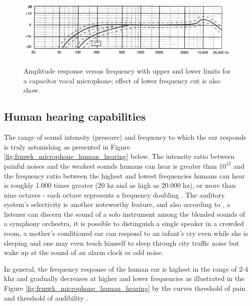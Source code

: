 \begin{figure}[htbp]
    \raggedright
        \caption{Amplitude response versus frequency with upper and lower limits for a capacitor vocal microphone; effect of lower frequency cut is also show.}
        \includegraphics[width=1\textwidth]{resources/images/030-theoretical_framework/Framework_microphone_frequency_response.png}
        \label{fig:frmwk_microphone_frequency_response}
\end{figure}

\subsection{Human hearing capabilities}
\label{subsec:microphones_Human_hearing_capabilities}

The range of sound intensity (pressure) and frequency to which the ear responds is truly astonishing as presented in Figure \ref{fig:frmwk_microphone_human_hearing} below. The intensity ratio between painful noises and the weakest sounds humans can hear is greater than $10^{12}$ and the frequency ratio between the highest and lowest frequencies humans can hear is roughly 1.000 times greater (20 \gls{hz} and as high as 20.000 \gls{hz}), or more than nine octaves - each octave represents a frequency doubling \cite{Rossing2013}. The auditory system's selectivity is another noteworthy feature, and also according to \textcite{Rossing2013}, a listener can discern the sound of a solo instrument among the blended sounds of a symphony orchestra, it is possible to distinguish a single speaker in a crowded room, a mother's conditioned ear can respond to an infant's cry even while she is sleeping and one may even teach himself to sleep through city traffic noise but wake up at the sound of an alarm clock or odd noise.

In general, the frequency response of the human ear is highest in the range of 2-4 \gls{k}\gls{hz} and gradually decreases at higher and lower frequencies as illustrated in the Figure \ref{fig:frmwk_microphone_human_hearing} by the curves threshold of pain and threshold of audibility \cite{Moore2013}.

